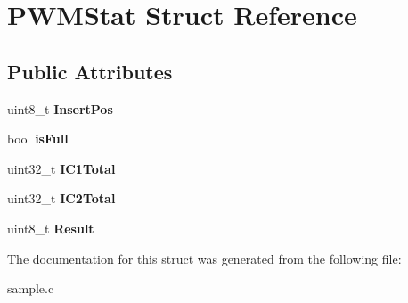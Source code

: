 \hypertarget{struct_p_w_m_stat}{}\section{P\+W\+M\+Stat Struct Reference}
\label{struct_p_w_m_stat}
\subsection*{Public Attributes}
\begin{DoxyCompactItemize}
\item 
\mbox{\label{struct_p_w_m_stat_a20ff089283345afb045859bb79ab517c}} 
uint8\+\_\+t {\bfseries Insert\+Pos}
\item 
\mbox{\label{struct_p_w_m_stat_a65aff3ad47c99ac9c712fdaf2b61276e}} 
bool {\bfseries is\+Full}
\item 
\mbox{\label{struct_p_w_m_stat_a88673dabd60219b50440b67a1d3372ac}} 
uint32\+\_\+t {\bfseries I\+C1\+Total}
\item 
\mbox{\label{struct_p_w_m_stat_a89684ad6ec23de14ad5d90473d6234c1}} 
uint32\+\_\+t {\bfseries I\+C2\+Total}
\item 
\mbox{\label{struct_p_w_m_stat_a47a4e1d39c97bbc6f314445269c531c1}} 
uint8\+\_\+t {\bfseries Result}
\end{DoxyCompactItemize}


The documentation for this struct was generated from the following file\+:\begin{DoxyCompactItemize}
\item 
sample.\+c\end{DoxyCompactItemize}
